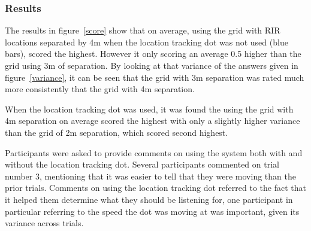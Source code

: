 \documentclass[../../main.tex]{subfiles}
\begin{document}
			\subsubsection{Results}

				The results in figure~\ref{score} show that on average, using the grid with \ac{RIR} locations separated by 4m when the location tracking dot was not used (blue bars), scored the highest. However it only scoring an average 0.5 higher than the grid using 3m of separation. By looking at that variance of the answers given in figure~\ref{variance}, it can be seen that the grid with 3m separation was rated much more consistently that the grid with 4m separation.

				When the location tracking dot was used, it was found the using the grid with 4m separation on average scored the highest with only a slightly higher variance than the grid of 2m separation, which scored second highest.

				Participants were asked to provide comments on using the system both with and without the location tracking dot. Several participants commented on trial number 3, mentioning that it was easier to tell that they were moving than the prior trials. Comments on using the location tracking dot referred to the fact that it helped them determine what they should be listening for, one participant in particular referring to the speed the dot was moving at was important, given its variance across trials.

\end{document}

